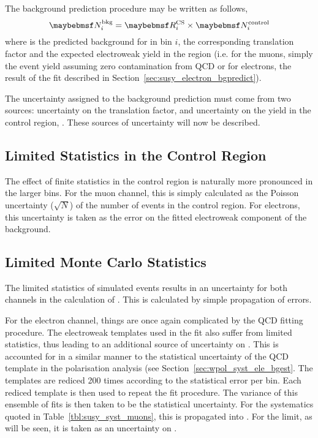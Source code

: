 The background prediction procedure may be written as follows,
\begin{equation}
\NBkgi = \RCSi \times \NControli
\end{equation}
where \NBkgi is the predicted background for \LPsignal in \STlep bin $i$, \RCSi
the corresponding translation factor and \NControli the expected electroweak
yield in the region \LPcontrol (i.e. for the muons, simply the event yield
assuming zero contamination from \ac{QCD} or for electrons, the result of the
fit described in Section~\ref{sec:susy_electron_bgpredict}).

The uncertainty assigned to the background prediction \NBkg must come from two
sources: uncertainty on the translation factor, \RCS and uncertainty on the yield
in the control region, \NControl. These sources of uncertainty will now be
described.

\subsection{Limited Statistics in the Control Region \texorpdfstring{\LPcontrol}{\LPcontrolBM}}
The effect of finite statistics in the control region is naturally more
pronounced in the larger \STlep bins. For the muon channel, this is simply
calculated as the Poisson uncertainty ($\sqrt{N}$) of the number of events in
the control region. For electrons, this uncertainty is taken as the error on the
fitted electroweak component of the background.

\subsection{Limited Monte Carlo Statistics}
\label{sec:susy_syst_mcstats}
The limited statistics of simulated events results in an uncertainty for both
channels in the calculation of \RCS. This is calculated by simple propagation of
errors.

For the electron channel, things are once again complicated by the \ac{QCD}
fitting procedure. The electroweak templates used in the fit also suffer from
limited statistics, thus leading to an additional source of uncertainty on
\NControl. This is accounted for in a similar manner to the statistical
uncertainty of the \ac{QCD} template in the \PW polarisation analysis (see
Section~\ref{sec:wpol_syst_ele_bgest}. The templates are rediced 200 times
according to the statistical error per bin. Each rediced template is then used
to repeat the fit procedure. The variance of this ensemble of fits is then taken
to be the statistical uncertainty. For the systematics quoted in
Table~\ref{tbl:susy_syst_muons}, this is propagated into \RCS. For the limit, as
will be seen, it is taken as an uncertainty on \NControl.

